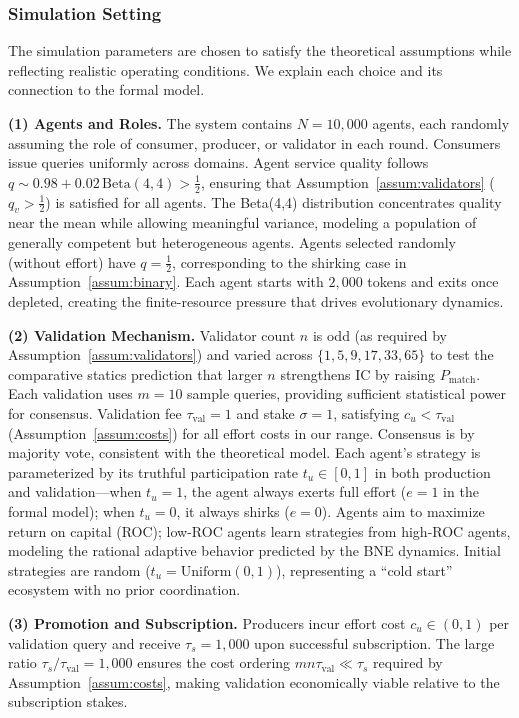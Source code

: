 \subsubsection{Simulation Setting}

The simulation parameters are chosen to satisfy the theoretical assumptions while reflecting realistic operating conditions. We explain each choice and its connection to the formal model.

\textbf{(1) Agents and Roles.}
The system contains $N = 10{,}000$ agents, each randomly assuming the role of consumer, producer, or validator in each round.
Consumers issue queries uniformly across domains.
Agent service quality follows $q \sim 0.98 + 0.02\,\mathrm{Beta}(4,4) > \frac{1}{2}$, ensuring that Assumption~\ref{assum:validators} ($q_v > \frac{1}{2}$) is satisfied for all agents.
The Beta(4,4) distribution concentrates quality near the mean while allowing meaningful variance, modeling a population of generally competent but heterogeneous agents.
Agents selected randomly (without effort) have $q = \frac{1}{2}$, corresponding to the shirking case in Assumption~\ref{assum:binary}.
Each agent starts with $2{,}000$ tokens and exits once depleted, creating the finite-resource pressure that drives evolutionary dynamics.

\textbf{(2) Validation Mechanism.}
Validator count $n$ is odd (as required by Assumption~\ref{assum:validators}) and varied across $\{1, 5, 9, 17, 33, 65\}$ to test the comparative statics prediction that larger $n$ strengthens IC by raising $P_{\text{match}}$.
Each validation uses $m = 10$ sample queries, providing sufficient statistical power for consensus.
Validation fee $\tau_{\text{val}} = 1$ and stake $\sigma = 1$, satisfying $c_u < \tau_{\text{val}}$ (Assumption~\ref{assum:costs}) for all effort costs in our range.
Consensus is by majority vote, consistent with the theoretical model.
Each agent's strategy is parameterized by its truthful participation rate $t_u \in [0, 1]$ in both production and validation---when $t_u = 1$, the agent always exerts full effort ($e = 1$ in the formal model); when $t_u = 0$, it always shirks ($e = 0$).
Agents aim to maximize return on capital (ROC); low-ROC agents learn strategies from high-ROC agents, modeling the rational adaptive behavior predicted by the BNE dynamics.
Initial strategies are random ($t_u = \text{Uniform}(0, 1)$), representing a ``cold start'' ecosystem with no prior coordination.

\textbf{(3) Promotion and Subscription.}
Producers incur effort cost $c_u \in (0, 1)$ per validation query and receive $\tau_s = 1{,}000$ upon successful subscription.
The large ratio $\tau_s / \tau_{\text{val}} = 1{,}000$ ensures the cost ordering $mn\tau_{\text{val}} \ll \tau_s$ required by Assumption~\ref{assum:costs}, making validation economically viable relative to the subscription stakes.

